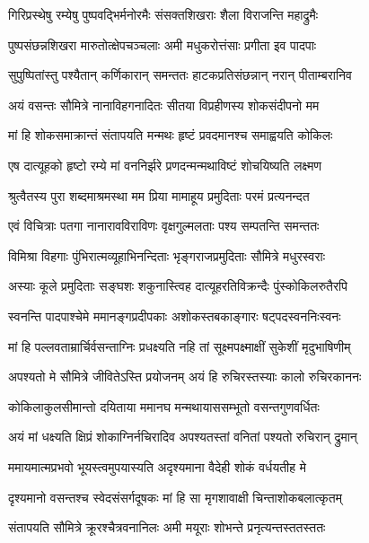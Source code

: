 \twolineshloka
{गिरिप्रस्थेषु रम्येषु पुष्पवद्भिर्मनोरमैः}
{संसक्तशिखराः शैला विराजन्ति महाद्रुमैः} %

\twolineshloka
{पुष्पसंछन्नशिखरा मारुतोत्क्षेपचञ्चलाः}
{अमी मधुकरोत्तंसाः प्रगीता इव पादपाः} %

\twolineshloka
{सुपुष्पितांस्तु पश्यैतान् कर्णिकारान् समन्ततः}
{हाटकप्रतिसंछन्नान् नरान् पीताम्बरानिव} %

\twolineshloka
{अयं वसन्तः सौमित्रे नानाविहगनादितः}
{सीतया विप्रहीणस्य शोकसंदीपनो मम} %

\twolineshloka
{मां हि शोकसमाक्रान्तं संतापयति मन्मथः}
{हृष्टं प्रवदमानश्च समाह्वयति कोकिलः} %

\twolineshloka
{एष दात्यूहको हृष्टो रम्ये मां वननिर्झरे}
{प्रणदन्मन्मथाविष्टं शोचयिष्यति लक्ष्मण} %

\twolineshloka
{श्रुत्वैतस्य पुरा शब्दमाश्रमस्था मम प्रिया}
{मामाहूय प्रमुदिताः परमं प्रत्यनन्दत} %

\twolineshloka
{एवं विचित्राः पतगा नानारावविराविणः}
{वृक्षगुल्मलताः पश्य सम्पतन्ति समन्ततः} %

\twolineshloka
{विमिश्रा विहगाः पुंभिरात्मव्यूहाभिनन्दिताः}
{भृङ्गराजप्रमुदिताः सौमित्रे मधुरस्वराः} %

\twolineshloka
{अस्याः कूले प्रमुदिताः सङ्घशः शकुनास्त्विह}
{दात्यूहरतिविक्रन्दैः पुंस्कोकिलरुतैरपि} %

\twolineshloka
{स्वनन्ति पादपाश्चेमे ममानङ्गप्रदीपकाः}
{अशोकस्तबकाङ्गारः षट्पदस्वननिःस्वनः} %

\twolineshloka
{मां हि पल्लवताम्रार्चिर्वसन्ताग्निः प्रधक्ष्यति}
{नहि तां सूक्ष्मपक्ष्माक्षीं सुकेशीं मृदुभाषिणीम्} %

\twolineshloka
{अपश्यतो मे सौमित्रे जीवितेऽस्ति प्रयोजनम्}
{अयं हि रुचिरस्तस्याः कालो रुचिरकाननः} %

\twolineshloka
{कोकिलाकुलसीमान्तो दयिताया ममानघ}
{मन्मथायाससम्भूतो वसन्तगुणवर्धितः} %

\twolineshloka
{अयं मां धक्ष्यति क्षिप्रं शोकाग्निर्नचिरादिव}
{अपश्यतस्तां वनितां पश्यतो रुचिरान् द्रुमान्} %

\twolineshloka
{ममायमात्मप्रभवो भूयस्त्वमुपयास्यति}
{अदृश्यमाना वैदेही शोकं वर्धयतीह मे} %

\twolineshloka
{दृश्यमानो वसन्तश्च स्वेदसंसर्गदूषकः}
{मां हि सा मृगशावाक्षी चिन्ताशोकबलात्कृतम्} %

\twolineshloka
{संतापयति सौमित्रे क्रूरश्चैत्रवनानिलः}
{अमी मयूराः शोभन्ते प्रनृत्यन्तस्ततस्ततः} %

